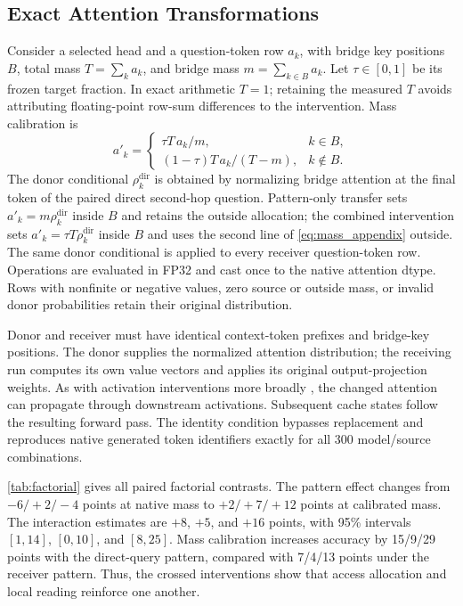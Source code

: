 \subsection{Exact Attention Transformations}

Consider a selected head and a question-token row $a_k$, with bridge key positions $B$, total mass $T=\sum_k a_k$, and bridge mass $m=\sum_{k\in B}a_k$. Let $\tau\in[0,1]$ be its frozen target fraction. In exact arithmetic $T=1$; retaining the measured $T$ avoids attributing floating-point row-sum differences to the intervention. Mass calibration is
\begin{equation}
 a'_k=\begin{cases}
 \tau T\,a_k/m, & k\in B,\\
 (1-\tau)T\,a_k/(T-m), & k\notin B.
 \end{cases}
 \label{eq:mass_appendix}
\end{equation}
The donor conditional $\rho_k^{\mathrm{dir}}$ is obtained by normalizing bridge attention at the final token of the paired direct second-hop question. Pattern-only transfer sets $a'_k=m\rho_k^{\mathrm{dir}}$ inside $B$ and retains the outside allocation; the combined intervention sets $a'_k=\tau T\rho_k^{\mathrm{dir}}$ inside $B$ and uses the second line of \cref{eq:mass_appendix} outside. The same donor conditional is applied to every receiver question-token row. Operations are evaluated in FP32 and cast once to the native attention dtype. Rows with nonfinite or negative values, zero source or outside mass, or invalid donor probabilities retain their original distribution.

Donor and receiver must have identical context-token prefixes and bridge-key positions. The donor supplies the normalized attention distribution; the receiving run computes its own value vectors and applies its original output-projection weights. As with activation interventions more broadly \citep{meng2022locating,zhang2024patching}, the changed attention can propagate through downstream activations. Subsequent cache states follow the resulting forward pass. The identity condition bypasses replacement and reproduces native generated token identifiers exactly for all 300 model/source combinations.

\cref{tab:factorial} gives all paired factorial contrasts. The pattern effect changes from $-6/+2/-4$ points at native mass to $+2/+7/+12$ points at calibrated mass. The interaction estimates are $+8$, $+5$, and $+16$ points, with 95\% intervals $[1,14]$, $[0,10]$, and $[8,25]$. Mass calibration increases accuracy by 15/9/29 points with the direct-query pattern, compared with 7/4/13 points under the receiver pattern. Thus, the crossed interventions show that access allocation and local reading reinforce one another.

